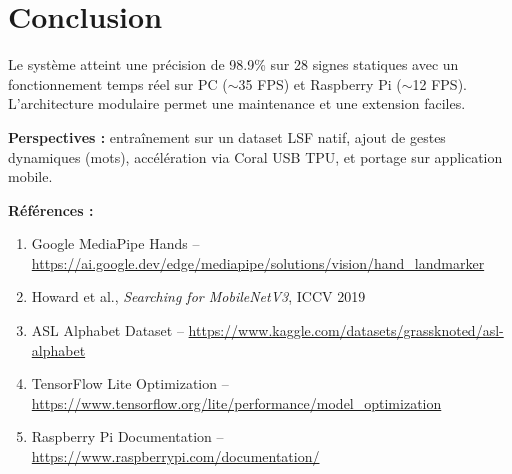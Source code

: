 \documentclass[11pt,a4paper]{article}
\begin{document}
\section{Conclusion}

Le système atteint une précision de 98.9\% sur 28 signes statiques avec un fonctionnement temps réel sur PC ($\sim$35 FPS) et Raspberry Pi ($\sim$12 FPS). L'architecture modulaire permet une maintenance et une extension faciles.

\textbf{Perspectives :} entraînement sur un dataset LSF natif, ajout de gestes dynamiques (mots), accélération via Coral USB TPU, et portage sur application mobile.

\vspace{0.3cm}
\noindent\textbf{Références :}
\begin{enumerate}\setlength\itemsep{0pt}\small
    \item Google MediaPipe Hands -- \url{https://ai.google.dev/edge/mediapipe/solutions/vision/hand_landmarker}
    \item Howard et al., \textit{Searching for MobileNetV3}, ICCV 2019
    \item ASL Alphabet Dataset -- \url{https://www.kaggle.com/datasets/grassknoted/asl-alphabet}
    \item TensorFlow Lite Optimization -- \url{https://www.tensorflow.org/lite/performance/model_optimization}
    \item Raspberry Pi Documentation -- \url{https://www.raspberrypi.com/documentation/}
\end{enumerate}
\end{document}
